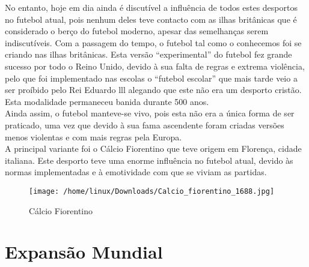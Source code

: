 \documentclass[a4paper,12pt]{report}
\begin{document}
\newpage
No entanto, hoje em dia ainda é discutível a influência de todos estes desportos no futebol atual, pois nenhum deles teve contacto com as ilhas britânicas que é considerado o berço do futebol moderno, apesar das semelhanças serem indiscutíveis.
Com a passagem do tempo, o futebol tal como o conhecemos foi se criando nas ilhas britânicas. Esta versão “experimental” do futebol fez grande sucesso por todo o Reino Unido, devido à sua falta de regras e extrema violência, pelo que foi implementado nas escolas o “futebol escolar” que mais tarde veio a ser proíbido pelo Rei Eduardo lll alegando que este não era um desporto cristão. Esta modalidade permaneceu banida durante 500 anos.\\ Ainda assim, o futebol manteve-se vivo, pois esta não era a única forma de ser praticado, uma vez que devido à sua fama ascendente foram criadas versões menos violentas e com mais regras pela Europa. \\
A principal variante foi o Cálcio Fiorentino que teve origem em Florença, cidade italiana. Este desporto teve uma enorme influência no futebol atual, devido às normas implementadas e à emotividade com que se viviam as partidas.

\begin{figure}[!htp]
\centering 
\texttt{[image: /home/linux/Downloads/Calcio\_fiorentino\_1688.jpg]}
\caption{Cálcio Fiorentino}
\end{figure}

\chapter{Expansão Mundial}
\label{Expansão Mundial}
\end{document}
